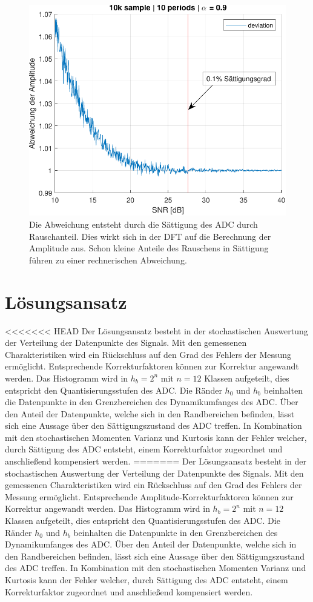  \begin{figure}[h!] 
	\centering 
	\includegraphics[width=.8\columnwidth]{../img/noise-err.pdf}
	\caption{Die Abweichung entsteht durch die Sättigung des ADC durch Rauschanteil. Dies wirkt sich in der DFT auf die Berechnung der Amplitude aus. Schon kleine Anteile des Rauschens in Sättigung führen zu einer rechnerischen Abweichung.}
	\label{fig:Rauschanteil}
\end{figure}

\section{Lösungsansatz} 

<<<<<<< HEAD
Der Lösungsansatz besteht in der stochastischen Auswertung der Verteilung der Datenpunkte des Signals. Mit den gemessenen Charakteristiken wird ein Rückschluss auf den Grad des Fehlers der Messung ermöglicht. Entsprechende Korrekturfaktoren können zur Korrektur angewandt werden. Das Histogramm wird in $h_b = 2^n$ mit $n = 12$ Klassen aufgeteilt, dies entspricht den Quantisierungsstufen des ADC. Die Ränder $h_0$ und $h_b$ beinhalten die Datenpunkte in den Grenzbereichen des Dynamikumfanges des ADC. Über den Anteil der Datenpunkte, welche sich in den Randbereichen befinden, lässt sich eine Aussage über den Sättigungszustand des ADC treffen. In Kombination mit den stochastischen Momenten Varianz und Kurtosis kann der Fehler welcher, durch Sättigung des ADC entsteht, einem Korrekturfaktor zugeordnet und anschließend kompensiert werden. 
=======
Der Lösungsansatz besteht in der stochastischen Auswertung der Verteilung der Datenpunkte des Signals. Mit den gemessenen Charakteristiken wird ein Rückschluss auf den Grad des Fehlers der Messung ermöglicht. Entsprechende Amplitude-Korrekturfaktoren können zur Korrektur angewandt werden. Das Histogramm wird in $h_b = 2^n$ mit $n = 12$ Klassen aufgeteilt, dies entspricht den Quantisierungsstufen des ADC. Die Ränder $h_0$ und $h_b$ beinhalten die Datenpunkte in den Grenzbereichen des Dynamikumfanges des ADC. Über den Anteil der Datenpunkte, welche sich in den Randbereichen befinden, lässt sich eine Aussage über den Sättigungszustand des ADC treffen. In Kombination mit den stochastischen Momenten Varianz und Kurtosis kann der Fehler welcher, durch Sättigung des ADC entsteht, einem Korrekturfaktor zugeordnet und anschließend kompensiert werden. 

